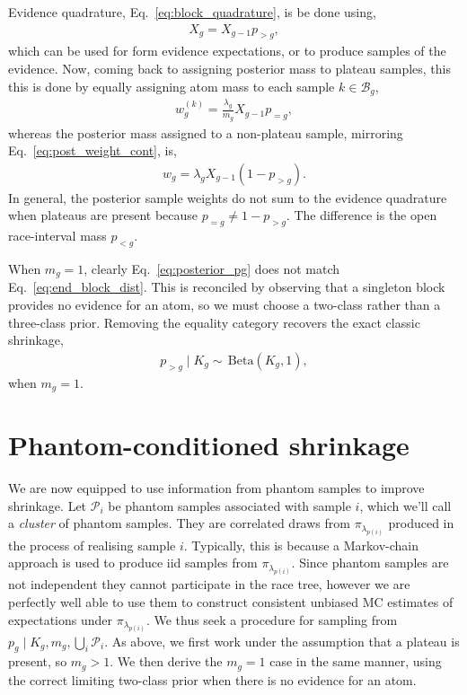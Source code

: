 \documentclass[pdflatex,sn-basic,icol]{sn-jnl}
\theoremstyle{plain}
\theoremstyle{definition}
\begin{document}
Evidence quadrature, Eq.~\ref{eq:block_quadrature}, is be done using,
\begin{align}
    X_g = X_{g-1} p_{>g},
\end{align}
which can be used for form evidence expectations, or to produce samples of the evidence.
Now, coming back to assigning posterior mass to plateau samples, this this is done by equally assigning atom mass to each sample $k\in\mathcal{B}_g$,
\begin{align}
    w^{(k)}_{g} = \frac{\lambda_g}{m_g} X_{g-1} p_{=g},
\end{align}
whereas the posterior mass assigned to a non-plateau sample, mirroring Eq.~\ref{eq:post_weight_cont}, is,
\begin{align}
    w_g = \lambda_g X_{g-1}(1 - p_{>g}).
\end{align}
In general, the posterior sample weights do not sum to the evidence quadrature when plateaus are present because $p_{=g}\neq 1-p_{>g}$.
The difference is the open race-interval mass $p_{<g}$.

When $m_g=1$, clearly Eq.~\ref{eq:posterior_pg} does not match Eq.~\ref{eq:end_block_dist}.
This is reconciled by observing that a singleton block provides no evidence for an atom, so we must choose a two-class rather than a three-class prior.
Removing the equality category recovers the exact classic shrinkage,
\begin{align}
    p_{>g} \mid K_g \sim\, \mathrm{Beta}(K_g,1),
\end{align}
when $m_g=1$.


\section{Phantom-conditioned shrinkage}
\label{sec:phantoms}

We are now equipped to use information from phantom samples to improve shrinkage.
Let $\mathcal{P}_i$ be phantom samples associated with sample $i$, which we'll call a \textit{cluster} of phantom samples.
They are correlated draws from $\pi_{\lambda_{p(i)}}$ produced in the process of realising sample $i$.
Typically, this is because a Markov-chain approach is used to produce iid samples from $\pi_{\lambda_{p(i)}}$.
Since phantom samples are not independent they cannot participate in the race tree, however we are perfectly well able to use them to construct consistent unbiased MC estimates of expectations under $\pi_{\lambda_{p(i)}}$.
We thus seek a procedure for sampling from $p_g \mid K_g, m_g, \bigcup_i \mathcal{P}_i$.
As above, we first work under the assumption that a plateau is present, so $m_g>1$.
We then derive the $m_g=1$ case in the same manner, using the correct limiting two-class prior when there is no evidence for an atom.
\end{document}
